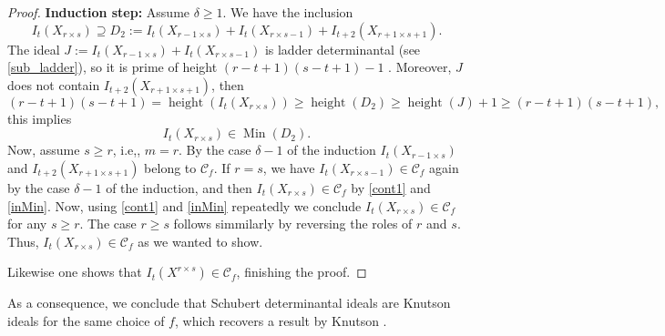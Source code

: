 \documentclass[12pt]{amsart}
\theoremstyle{definition}
\newtheorem{definition}[definition]{Definition}
\renewcommand{\(}{\left(}
\renewcommand{\)}{\right)}
\newcommand{\height}{\operatorname{height}}
\renewcommand{\!}[1]{{\color{red}\text{\Huge$\star$ }#1}}
\newcommand{\gs}{\geqslant}
\newcommand{\MIN}{\operatorname{Min}}
\begin{document}
\begin{proof}
{\bf Induction step:}  Assume $\delta\gs 1$. We have the inclusion
\begin{equation}\label{cont1}
	I_{t}(X_{r \times s}) \supseteq D_2:=I_{t}(X_{r-1 \times s}) + I_{t}(X_{r \times s-1}) +I_{t+2}(X_{r+1 \times s+1}).
\end{equation}
The ideal  $J:= I_{t}(X_{r-1 \times s}) + I_{t}(X_{r \times s-1})$ is  ladder determinantal  (see  \autoref{sub_ladder}), so it is prime of height $(r-t+1)(s-t+1)-1$ \cite{GorlaMixed}. Moreover, $J$ does not contain $I_{t+2}(X_{r+1 \times s+1})$, then  
$$(r-t+1)(s-t+1)=\height\left(I_{t}(X_{r \times s})\right)\gs\height(D_2)\gs \height(J)+1\gs (r-t+1)(s-t+1),$$ this implies 
\begin{equation}\label{inMin}
	I_{t}(X_{r \times s}) \in \MIN ( D_2).
\end{equation}
Now, assume $s\gs r$, i.e,, $m=r$. By  the case $\delta -1$ of the induction $ I_{t}(X_{r-1 \times s})$ and $I_{t+2}(X_{r+1 \times s+1})$ belong to $\mathcal{C}_f$. 
If $r=s$, we have $I_{t}(X_{r \times s-1})\in \mathcal{C}_f$ again  by   the case $\delta -1$ of the induction, and then $I_{t}(X_{r \times s})\in \mathcal{C}_f$ by \eqref{cont1} and \eqref{inMin}. Now,  using \eqref{cont1} and \eqref{inMin} repeatedly we conclude  $I_{t}(X_{r \times s}) \in \mathcal{C}_f$ for any $s\gs r$. The case $r\gs s$ follows simmilarly by reversing the roles of $r$ and $s$.  Thus, $I_t(X_{r\times s}) \in \mathcal{C}_f$ as we wanted to show.

Likewise one shows that $I_t(X^{r\times s}) \in \mathcal{C}_f$,  finishing the proof.
\end{proof}





As a consequence, we conclude  that Schubert determinantal ideals are Knutson ideals for the same choice of $f$, which recovers a result by Knutson \cite{knutson2009frobenius}.
\end{document}
